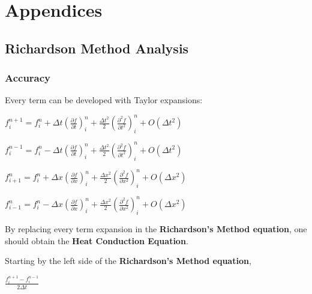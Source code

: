 \documentclass[12pt]{report}
\begin{document}
\newpage

\section*{Appendices}

\subsection*{Richardson Method Analysis}

\subsubsection*{Accuracy}

Every term can be developed with Taylor expansions:


\begin{center}
\Large
$
f_i^{n + 1} = f_i^{n} + \Delta t \left( \frac{\partial f}{\partial t} \right)_i^n + \frac{\Delta t ^2}{2} \left( \frac{\partial ^2 f}{\partial t ^2} \right)_i^n + O(\Delta t ^2)
$
\end{center}
\begin{center}
\Large
$
f_i^{n - 1} = f_i^{n} - \Delta t \left( \frac{\partial f}{\partial t} \right)_i^n + \frac{\Delta t ^2}{2} \left( \frac{\partial ^2 f}{\partial t ^2} \right)_i^n + O(\Delta t ^2)
$
\end{center}
\begin{center}
\Large
$
f_{i + 1}^{n} = f_i^{n} + \Delta x \left( \frac{\partial f}{\partial x} \right)_i^n + \frac{\Delta x ^2}{2} \left( \frac{\partial ^2 f}{\partial x ^2} \right)_i^n + O(\Delta x ^2)
$
\end{center}
\begin{center}
\Large
$
f_{i - 1}^{n} = f_i^{n} - \Delta x \left( \frac{\partial f}{\partial x} \right)_i^n + \frac{\Delta x ^2}{2} \left( \frac{\partial ^2 f}{\partial x ^2} \right)_i^n + O(\Delta x ^2)
$
\end{center}

\par By replacing every term expansion in the \textbf{Richardson's Method equation}, one should obtain the \textbf{Heat Conduction Equation}.

\par Starting by the left side of the \textbf{Richardson's Method equation},
\begin{center}
\Large
$
\frac{f_i^{n + 1} - f_i^{n - 1}}{2 \Delta t}
$
\end{center}
\end{document}
